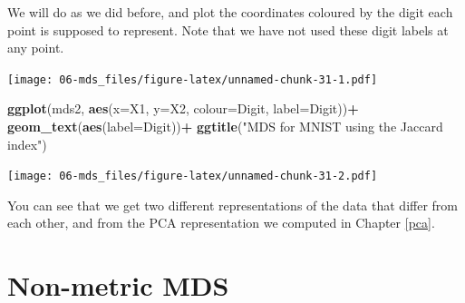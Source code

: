 \documentclass[]{book}
\newenvironment{Shaded}{\begin{snugshade}}{\end{snugshade}}
\newcommand{\DataTypeTok}[1]{\textcolor[rgb]{0.13,0.29,0.53}{#1}}
\newcommand{\DecValTok}[1]{\textcolor[rgb]{0.00,0.00,0.81}{#1}}
\newcommand{\KeywordTok}[1]{\textcolor[rgb]{0.13,0.29,0.53}{\textbf{#1}}}
\newcommand{\NormalTok}[1]{#1}
\newcommand{\OperatorTok}[1]{\textcolor[rgb]{0.81,0.36,0.00}{\textbf{#1}}}
\newcommand{\StringTok}[1]{\textcolor[rgb]{0.31,0.60,0.02}{#1}}
\theoremstyle{definition}
\theoremstyle{definition}
\theoremstyle{definition}
\theoremstyle{remark}
\begin{document}
We will do as we did before, and plot the coordinates coloured by the digit each point is supposed to represent. Note that we have not used these digit labels at any point.

\begin{Shaded}
\end{Shaded}

\texttt{[image: 06-mds\_files/figure-latex/unnamed-chunk-31-1.pdf]}

\begin{Shaded}
\begin{Highlighting}[]
\KeywordTok{ggplot}\NormalTok{(mds2, }\KeywordTok{aes}\NormalTok{(}\DataTypeTok{x=}\NormalTok{X1, }\DataTypeTok{y=}\NormalTok{X2, }\DataTypeTok{colour=}\NormalTok{Digit, }\DataTypeTok{label=}\NormalTok{Digit))}\OperatorTok{+}
\StringTok{  }\KeywordTok{geom_text}\NormalTok{(}\KeywordTok{aes}\NormalTok{(}\DataTypeTok{label=}\NormalTok{Digit))}\OperatorTok{+}\StringTok{ }\KeywordTok{ggtitle}\NormalTok{(}\StringTok{"MDS for MNIST using the Jaccard index"}\NormalTok{) }
\end{Highlighting}
\end{Shaded}

\texttt{[image: 06-mds\_files/figure-latex/unnamed-chunk-31-2.pdf]}

You can see that we get two different representations of the data that differ from each other, and from the PCA representation we computed in Chapter \ref{pca}.

\hypertarget{non-metric-mds}{%
\section{Non-metric MDS}\label{non-metric-mds}}
\end{document}

